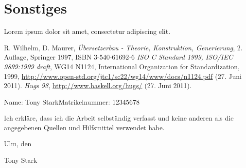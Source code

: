 \documentclass[a4paper,10pt
headsepline,           %
doubleside,            %
pointlessnumbers,      %
bibtotoc,              %
BCOR15mm,               %
leqno					%
]{scrbook}
\newcommand{\fullname}{Tony Stark}
\newcommand{\matrikelnummer}{12345678}
\begin{document}
\chapter{Sonstiges}

Lorem ipsum dolor sit amet, consectetur adipiscing elit.


\cleardoublepage %
{}
\listoffigures


\cleardoublepage %
{}
\listoftables


\cleardoublepage %
{}
\begin{thebibliography}{123}
	{\sc R. Wilhelm, D. Maurer},
	{\itshape Übersetzerbau - Theorie, Konstruktion, Generierung},
	2. Auflage, Springer 1997, ISBN 3-540-61692-6
	{\itshape ISO C Standard 1999, ISO/IEC 9899:1999 draft},
	WG14 N1124, International Organization for Standardization, 1999,
	\url{http://www.open-std.org/jtc1/sc22/wg14/www/docs/n1124.pdf} (27. Juni 2011).
	{\itshape Hugs 98},
	\url{http://www.haskell.org/hugs/} (27. Juni 2011).
\end{thebibliography}

\clearpage
\thispagestyle{empty}

\noindent Name: \fullname \hfill Matrikelnummer: \matrikelnummer \vspace{2cm}


Ich erkläre, dass ich die Arbeit selbständig verfasst und keine anderen als die angegebenen Quellen und Hilfsmittel verwendet habe.\vspace{2cm}

\noindent Ulm, den \dotfill

\hspace{10cm} {\footnotesize \fullname}
\end{document}
